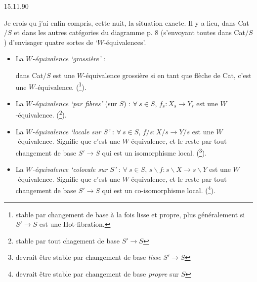 \documentclass[11pt]{article}
\newcommand{\printedpage}[1]{\marginpar{\footnotesize p.~#1}}
\newcommand{\msp}[1]{\marginpar{\footnotesize [#1]}}
\begin{document}
\printedpage{24}

\msp{page 41}

\begin{flushright}
15.11.90
\end{flushright}

Je crois qu j'ai enfin compris, cette nuit, la situation exacte. Il y a lieu, dans Cat$/S$ et dans les autres catégories du diagramme p. 8 (s'envoyant toutes dans Cat$/S$) d'envisager quatre sortes de ‘$W$-équivalences’. %

\begin{itemize}
\item[a)] La \textit{$W$-équivalence ‘grossière’} :  dans Cat$/S$ est une $W$-équivalence grossière si en tant que flèche de Cat, c'est une $W$-équivalence. (\footnote[17]{stable par changement de base à la fois lisse et propre, plus généralement si $S' \longrightarrow S$ est une Hot-fibration.}).

\item[b)] La \textit{$W$-équivalence ‘par fibres’} (sur $S$) : $\forall\ s \in S$, $f_s : X_s \longrightarrow Y_s$ est une $W$-équivalence. (\footnote[18]{stable par tout chagement de base $S' \longrightarrow S$}). %

\item[c)] La \textit{$W$-équivalence ‘locale sur $S$’} : $\forall\ s \in S$, $f/s : X/s \longrightarrow Y/s$ est une $W$-équivalence. Signifie que c'est une $W$-équivalence, et le reste par tout changement de base $S' \longrightarrow S$ qui est un isomorphisme local. (\footnote[19]{devrait être stable par changement de base \textit{lisse} $S' \longrightarrow S$}).

\item[c$'$)] La \textit{$W$-équivalence ‘colocale sur $S$’} : $\forall\ s \in S$, $s\backslash f : s\backslash X \longrightarrow s\backslash Y$ est une $W$-équivalence. Signifie que c'est une $W$-équivalence, et le reste par tout changement de base $S' \longrightarrow S$ qui est un co-isomorphisme local. (\footnote[20]{devrait être stable par changement de base \textit{propre} sur $S$}).
\end{itemize}
\end{document}
